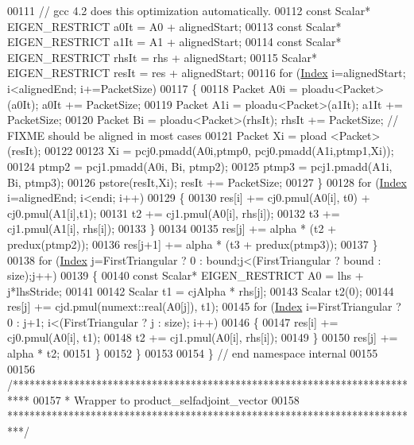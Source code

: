 \begin{DoxyCode}
00111     \textcolor{comment}{// gcc 4.2 does this optimization automatically.}
00112     \textcolor{keyword}{const} Scalar* EIGEN\_RESTRICT a0It  = A0  + alignedStart;
00113     \textcolor{keyword}{const} Scalar* EIGEN\_RESTRICT a1It  = A1  + alignedStart;
00114     \textcolor{keyword}{const} Scalar* EIGEN\_RESTRICT rhsIt = rhs + alignedStart;
00115           Scalar* EIGEN\_RESTRICT resIt = res + alignedStart;
00116     \textcolor{keywordflow}{for} (\hyperlink{namespace_eigen_a62e77e0933482dafde8fe197d9a2cfde}{Index} i=alignedStart; i<alignedEnd; i+=PacketSize)
00117     \{
00118       Packet A0i = ploadu<Packet>(a0It);  a0It  += PacketSize;
00119       Packet A1i = ploadu<Packet>(a1It);  a1It  += PacketSize;
00120       Packet Bi  = ploadu<Packet>(rhsIt); rhsIt += PacketSize; \textcolor{comment}{// FIXME should be aligned in most cases}
00121       Packet Xi  = pload <Packet>(resIt);
00122 
00123       Xi    = pcj0.pmadd(A0i,ptmp0, pcj0.pmadd(A1i,ptmp1,Xi));
00124       ptmp2 = pcj1.pmadd(A0i,  Bi, ptmp2);
00125       ptmp3 = pcj1.pmadd(A1i,  Bi, ptmp3);
00126       pstore(resIt,Xi); resIt += PacketSize;
00127     \}
00128     \textcolor{keywordflow}{for} (\hyperlink{namespace_eigen_a62e77e0933482dafde8fe197d9a2cfde}{Index} i=alignedEnd; i<endi; i++)
00129     \{
00130       res[i] += cj0.pmul(A0[i], t0) + cj0.pmul(A1[i],t1);
00131       t2 += cj1.pmul(A0[i], rhs[i]);
00132       t3 += cj1.pmul(A1[i], rhs[i]);
00133     \}
00134 
00135     res[j]   += alpha * (t2 + predux(ptmp2));
00136     res[j+1] += alpha * (t3 + predux(ptmp3));
00137   \}
00138   \textcolor{keywordflow}{for} (\hyperlink{namespace_eigen_a62e77e0933482dafde8fe197d9a2cfde}{Index} j=FirstTriangular ? 0 : bound;j<(FirstTriangular ? bound : size);j++)
00139   \{
00140     \textcolor{keyword}{const} Scalar* EIGEN\_RESTRICT A0 = lhs + j*lhsStride;
00141 
00142     Scalar t1 = cjAlpha * rhs[j];
00143     Scalar t2(0);
00144     res[j] += cjd.pmul(numext::real(A0[j]), t1);
00145     \textcolor{keywordflow}{for} (\hyperlink{namespace_eigen_a62e77e0933482dafde8fe197d9a2cfde}{Index} i=FirstTriangular ? 0 : j+1; i<(FirstTriangular ? j : size); i++)
00146     \{
00147       res[i] += cj0.pmul(A0[i], t1);
00148       t2 += cj1.pmul(A0[i], rhs[i]);
00149     \}
00150     res[j] += alpha * t2;
00151   \}
00152 \}
00153 
00154 \} \textcolor{comment}{// end namespace internal }
00155 
00156 \textcolor{comment}{/***************************************************************************}
00157 \textcolor{comment}{* Wrapper to product\_selfadjoint\_vector}
00158 \textcolor{comment}{***************************************************************************/}

\end{DoxyCode}
